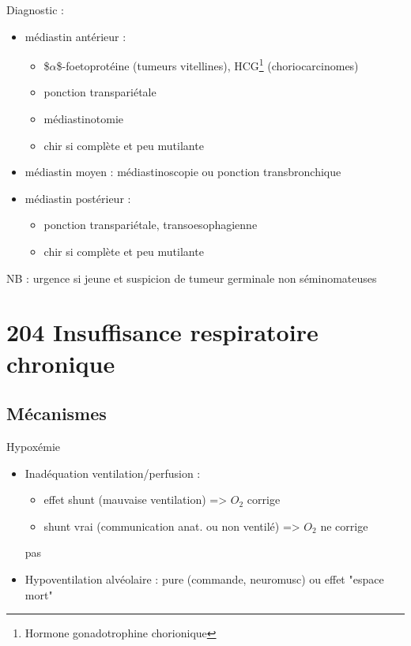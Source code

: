 \documentclass{book}
\begin{document}
Diagnostic :

\begin{itemize}
\item médiastin antérieur : 

\begin{itemize}
\item \$\(\alpha\)\$-foetoprotéine (tumeurs vitellines), HCG\footnote{Hormone gonadotrophine chorionique} (choriocarcinomes)
\item ponction transpariétale
\item médiastinotomie
\item chir si complète et peu mutilante
\end{itemize}

\item médiastin moyen : médiastinoscopie ou ponction transbronchique
\item médiastin postérieur : 

\begin{itemize}
\item ponction transpariétale, transoesophagienne
\item chir si complète et peu mutilante
\end{itemize}
\end{itemize}



NB : urgence si jeune et suspicion de tumeur germinale non séminomateuses

\section{204 \textdagger{} Insuffisance respiratoire chronique}
\label{sec:org5f29f19}
\label{sec:org6d633b6}
\subsection{Mécanismes}
\label{sec:orgbecb446}
\label{sec:org47f478d}
Hypoxémie

\begin{itemize}
\item Inadéquation ventilation/perfusion :

\begin{itemize}
\item effet shunt (mauvaise ventilation) => \(O_2\) corrige
\item shunt vrai (communication anat. ou non ventilé) => \(O_2\) ne corrige
\end{itemize}
pas

\item Hypoventilation alvéolaire : pure (commande, neuromusc) ou effet "espace mort"
\end{itemize}
\end{document}
